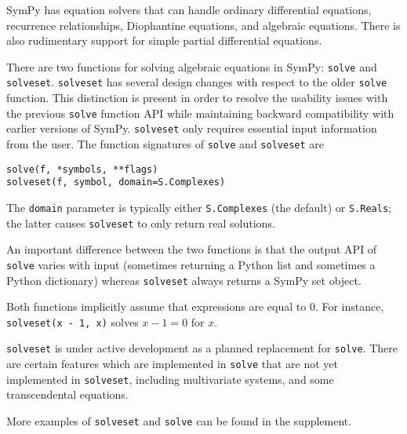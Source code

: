 SymPy has equation solvers that can handle ordinary differential
equations, recurrence relationships, Diophantine equations, and algebraic
equations. There is also
rudimentary support for simple partial differential equations.

There are two functions for solving algebraic equations in SymPy:
\texttt{solve} and \texttt{solveset}.
\texttt{solveset} has several design changes with respect to the older
\texttt{solve} function. This distinction is present in order to resolve the
usability issues with the
previous \texttt{solve} function API while maintaining backward compatibility
with earlier versions of SymPy.
\texttt{solveset} only requires essential input information from the user.
The function signatures of \texttt{solve} and \texttt{solveset} are
\begin{verbatim}
solve(f, *symbols, **flags)
solveset(f, symbol, domain=S.Complexes)
\end{verbatim}
The \texttt{domain} parameter is typically either \texttt{S.Complexes} (the
default) or \texttt{S.Reals}; the latter causes \texttt{solveset} to only return real solutions.

An important difference between the two functions is that the output API of \texttt{solve}
varies with input (sometimes returning a Python list and sometimes a Python dictionary) whereas
\texttt{solveset} always returns
a SymPy set object.

Both functions implicitly assume that expressions are equal to 0. For
instance, \texttt{solveset(x - 1, x)} solves $x - 1 = 0$ for $x$.

\texttt{solveset} is under active development as a planned replacement for
\texttt{solve}. There are certain features which are implemented in
\texttt{solve} that are not yet implemented in \texttt{solveset}, including
multivariate systems, and some transcendental equations.

More examples of \texttt{solveset} and \texttt{solve} can be found in the
supplement.
